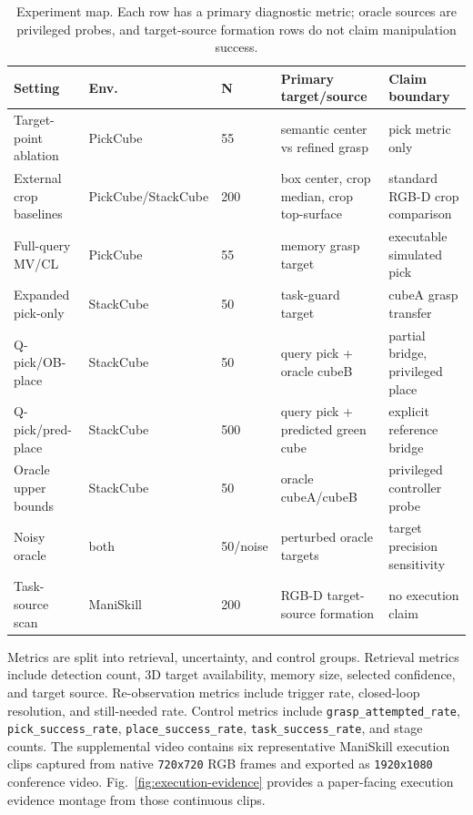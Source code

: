 \documentclass[conference]{IEEEtran}
\begin{document}
\begin{table}[t]
\centering
\caption{Experiment map. Each row has a primary diagnostic metric; oracle
sources are privileged probes, and target-source formation rows do not claim
manipulation success.}
\label{tab:protocol}
\scriptsize
\setlength{\tabcolsep}{2.8pt}
\begin{tabular}{lllll}
\toprule
Setting & Env. & N & Primary target/source & Claim boundary \\
\midrule
Target-point ablation & PickCube & 55 & semantic center vs refined grasp & pick metric only \\
External crop baselines & PickCube/StackCube & 200 & box center, crop median, crop top-surface & standard RGB-D crop comparison \\
Full-query MV/CL & PickCube & 55 & memory grasp target & executable simulated pick \\
Expanded pick-only & StackCube & 50 & task-guard target & cubeA grasp transfer \\
Q-pick/OB-place & StackCube & 50 & query pick + oracle cubeB & partial bridge, privileged place \\
Q-pick/pred-place & StackCube & 500 & query pick + predicted green cube & explicit reference bridge \\
Oracle upper bounds & StackCube & 50 & oracle cubeA/cubeB & privileged controller probe \\
Noisy oracle & both & 50/noise & perturbed oracle targets & target precision sensitivity \\
Task-source scan & ManiSkill & 200 & RGB-D target-source formation & no execution claim \\
\bottomrule
\end{tabular}
\end{table}

Metrics are split into retrieval, uncertainty, and control groups. Retrieval
metrics include detection count, 3D target availability, memory size, selected
confidence, and target source. Re-observation metrics include trigger rate,
closed-loop resolution, and still-needed rate. Control metrics include
\texttt{grasp\_attempted\_rate}, \texttt{pick\_success\_rate},
\texttt{place\_success\_rate}, \texttt{task\_success\_rate}, and stage counts.
The supplemental video contains six representative ManiSkill execution clips
captured from native \texttt{720x720} RGB frames and exported as
\texttt{1920x1080} conference video. Fig.~\ref{fig:execution-evidence}
provides a paper-facing execution evidence montage from those continuous clips.
\end{document}
